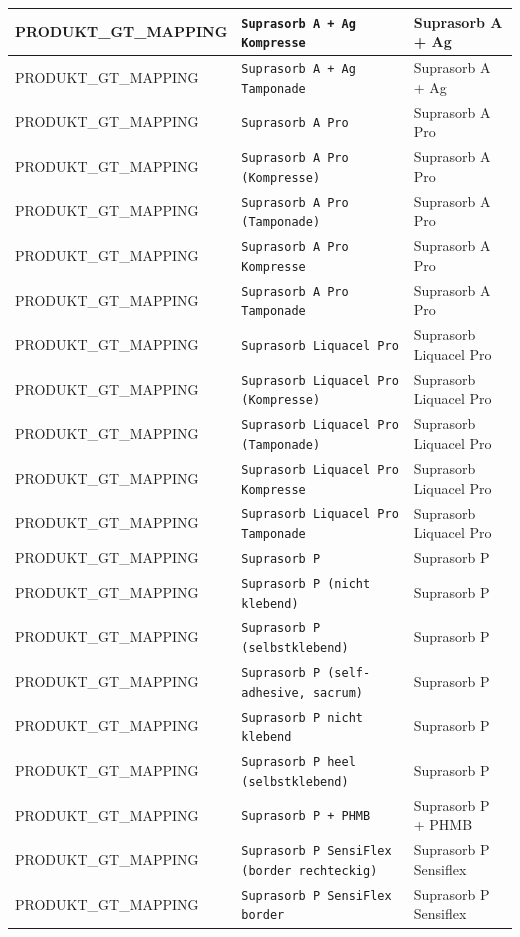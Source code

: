 \begin{longtable}{|p{3.5cm}|p{5cm}|p{6.5cm}|}
PRODUKT\_GT\_MAPPING & \texttt{Suprasorb A + Ag Kompresse} & Suprasorb A + Ag \\ \hline
PRODUKT\_GT\_MAPPING & \texttt{Suprasorb A + Ag Tamponade} & Suprasorb A + Ag \\ \hline
PRODUKT\_GT\_MAPPING & \texttt{Suprasorb A Pro} & Suprasorb A Pro \\ \hline
PRODUKT\_GT\_MAPPING & \texttt{Suprasorb A Pro (Kompresse)} & Suprasorb A Pro \\ \hline
PRODUKT\_GT\_MAPPING & \texttt{Suprasorb A Pro (Tamponade)} & Suprasorb A Pro \\ \hline
PRODUKT\_GT\_MAPPING & \texttt{Suprasorb A Pro Kompresse} & Suprasorb A Pro \\ \hline
PRODUKT\_GT\_MAPPING & \texttt{Suprasorb A Pro Tamponade} & Suprasorb A Pro \\ \hline
PRODUKT\_GT\_MAPPING & \texttt{Suprasorb Liquacel Pro} & Suprasorb Liquacel Pro \\ \hline
PRODUKT\_GT\_MAPPING & \texttt{Suprasorb Liquacel Pro (Kompresse)} & Suprasorb Liquacel Pro \\ \hline
PRODUKT\_GT\_MAPPING & \texttt{Suprasorb Liquacel Pro (Tamponade)} & Suprasorb Liquacel Pro \\ \hline
PRODUKT\_GT\_MAPPING & \texttt{Suprasorb Liquacel Pro Kompresse} & Suprasorb Liquacel Pro \\ \hline
PRODUKT\_GT\_MAPPING & \texttt{Suprasorb Liquacel Pro Tamponade} & Suprasorb Liquacel Pro \\ \hline
PRODUKT\_GT\_MAPPING & \texttt{Suprasorb P} & Suprasorb P \\ \hline
PRODUKT\_GT\_MAPPING & \texttt{Suprasorb P (nicht klebend)} & Suprasorb P \\ \hline
PRODUKT\_GT\_MAPPING & \texttt{Suprasorb P (selbstklebend)} & Suprasorb P \\ \hline
PRODUKT\_GT\_MAPPING & \texttt{Suprasorb P (self-adhesive, sacrum)} & Suprasorb P \\ \hline
PRODUKT\_GT\_MAPPING & \texttt{Suprasorb P nicht klebend} & Suprasorb P \\ \hline
PRODUKT\_GT\_MAPPING & \texttt{Suprasorb P heel (selbstklebend)} & Suprasorb P \\ \hline
PRODUKT\_GT\_MAPPING & \texttt{Suprasorb P + PHMB} & Suprasorb P + PHMB \\ \hline
PRODUKT\_GT\_MAPPING & \texttt{Suprasorb P SensiFlex (border rechteckig)} & Suprasorb P Sensiflex \\ \hline
PRODUKT\_GT\_MAPPING & \texttt{Suprasorb P SensiFlex border} & Suprasorb P Sensiflex \\ \hline

\end{longtable}
